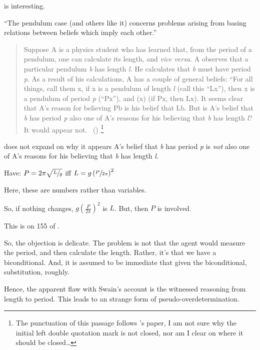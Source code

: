 \begin{note}
  \citeauthor{Tolliver:1982us} is interesting.

  ``The pendulum case (and others like it) concerns problems arising from basing relations between beliefs which imply each other.''

  \begin{quote}
    Suppose A is a physics student who has learned that, from the period of a pendulum, one can calculate its length, and \emph{vice versa}.
    A observes that a particular pendulum \emph{b} has length \emph{l}.
    He calculates that \emph{b} must have period \emph{p}.
    As a result of his calculations, A has a couple of general beliefs:
    ``For all things, call them x, if x is a pendulum of length \emph{l} (call this ``Lx''), then x is a pendulum of period \emph{p} (``Px''), and (x) (if Px, then Lx).
    It seems clear that A's reason for believing Pb is his belief that Lb.
    But is A's belief that \emph{b} has period \emph{p} also one of A's reasons for his believing that \emph{b} has length \emph{l}?
    It would appear not.\newline
    \mbox{ }\hfill\mbox{(\citeyear[152]{Tolliver:1982us})}%
    \footnote{The punctuation of this passage follows \citeauthor{Tolliver:1982us}'s paper, I am not sure why the initial left double quotation mark is not closed, nor am I clear on where it should be closed\dots}
  \end{quote}
  \citeauthor{Tolliver:1982us} does not expand on why it appears A's belief that \emph{b} has period \emph{p} is \emph{not} also one of A's reasons for his believing that \emph{b} has length \emph{l}.
\end{note}

\begin{note}
  Have:
  \(P = 2\pi\sqrt{\sfrac{L}{g}}\) iff \(L = g \left(\sfrac{P}{2\pi}\right)^{2}\)

  Here, these are numbers rather than variables.

  So, if nothing changes, \(g(\frac{P}{2\pi})^{2}\) is \(L\).
  But, then \(P\) is involved.

  This is on 155 of \citeauthor{Tolliver:1982us}.

  So, the objection is delicate.
  The problem is not that the agent would measure the period, and then calculate the length.
  Rather, it's that we have a biconditional.
  And, it is assumed to be immediate that given the biconditional, substitution, roughly.

  Hence, the apparent flaw with Swain's account is the witnessed reasoning from length to period.
  This leads to an strange form of pseudo-overdetermination.
\end{note}

